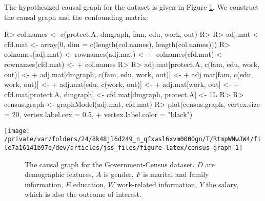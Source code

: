\documentclass[
  notitle]{jss}
\begin{document}
The hypothesized causal graph for the dataset is given in Figure
\ref{fig:censusgraph}. We construct the causal graph and the confounding
matrix:

\begin{CodeChunk}
\begin{CodeInput}
R> col.names <- c(protect.A, dmgraph, fam, edu, work, out)
R> 
R> adj.mat <- cfd.mat <- array(0, dim = c(length(col.names), length(col.names)))
R> colnames(adj.mat) <- rownames(adj.mat) <-
+   colnames(cfd.mat) <- rownames(cfd.mat) <-
+   col.names
R> 
R> adj.mat[protect.A, c(fam, edu, work, out)] <-
+   adj.mat[dmgraph, c(fam, edu, work, out)] <-
+   adj.mat[fam, c(edu, work, out)] <-
+   adj.mat[edu, c(work, out)] <-
+   adj.mat[work, out] <-
+   cfd.mat[protect.A, dmgraph] <- cfd.mat[dmgraph, protect.A] <- 1L
R> 
R> census.graph <- graphModel(adj.mat, cfd.mat)
R> plot(census.graph, vertex.size = 20, vertex.label.cex = 0.5,
+   vertex.label.color = "black")
\end{CodeInput}


\begin{center}\texttt{[image: /private/var/folders/24/8k48jl6d249\_n\_qfxwsl6xvm0000gn/T/RtmpWNwJW4/file7a16141b97e/dev/articles/jss\_files/figure-latex/census-graph-1]} \end{center}

\end{CodeChunk}

\begin{figure} \centering
    \caption{The causal graph for the Government-Census dataset. $D$ are demographic features, $A$ is gender, $F$ is marital and family information, $E$ education, $W$ work-related information, $Y$ the salary, which is also the outcome of interest.}
    \label{fig:censusgraph}
\end{figure}
\end{document}
